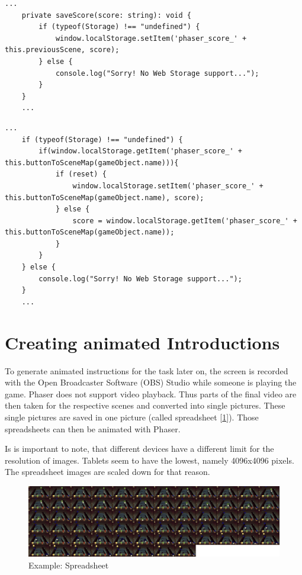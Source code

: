 \begin{lstlisting}[style=TypeScript, caption={Storage access (scoreScene.ts)}, label={lst:storageaccess1}]
    ...
    private saveScore(score: string): void {
        if (typeof(Storage) !== "undefined") {
            window.localStorage.setItem('phaser_score_' + this.previousScene, score);
        } else {
            console.log("Sorry! No Web Storage support...");
        }
    }
    ...
\end{lstlisting}

\begin{lstlisting}[style=TypeScript, caption={Storage access (levelMenuScene.ts)}, label={lst:storageaccess2}]
    ...
    if (typeof(Storage) !== "undefined") {
        if(window.localStorage.getItem('phaser_score_' + this.buttonToSceneMap(gameObject.name))){
            if (reset) {
                window.localStorage.setItem('phaser_score_' + this.buttonToSceneMap(gameObject.name), score);
            } else {
                score = window.localStorage.getItem('phaser_score_' + this.buttonToSceneMap(gameObject.name));
            }
        }
    } else {
        console.log("Sorry! No Web Storage support...");
    }
    ...
\end{lstlisting}

\section{Creating animated Introductions}\label{sec:creating-animated-introductions}
To generate animated instructions for the task later on,
the screen is recorded with the Open Broadcaster Software (OBS) Studio\cite{obs} while someone is playing the game.
Phaser does not support video playback.
Thus parts of the final video are then taken for the respective scenes and converted into single pictures.
These single pictures are saved in one picture (called spreadsheet [\ref{fig:spreadsheet}]).
Those spreadsheets can then be animated with Phaser.

Is is important to note, that different devices have a different limit for the resolution of images.
Tablets seem to have the lowest, namely 4096x4096 pixels\cite{webglmaxtexturesize}.
The spreadsheet images are scaled down for that reason.

\begin{figure}[H]
    \centering
    \includegraphics[width=1\textwidth]{figures/spreadsheet}
    \caption{Example: Spreadsheet}
    \label{fig:spreadsheet}
\end{figure}

